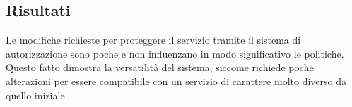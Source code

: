 \subsection{Risultati}
Le modifiche richieste per proteggere il servizio tramite il sistema di autorizzazione sono poche e 
non influenzano in modo significativo le politiche. Questo fatto dimostra la versatilità del sistema, 
siccome richiede poche alterazioni per essere compatibile con un servizio di carattere molto diverso 
da quello iniziale.   

